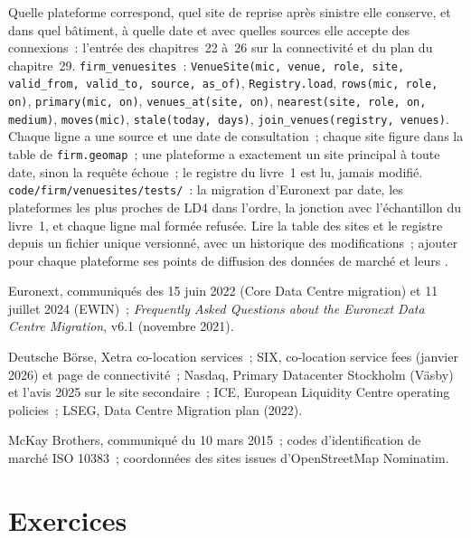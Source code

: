 \begin{build}
 Quelle plateforme correspond, quel site de reprise après sinistre elle conserve, et dans quel bâtiment, à quelle date et avec quelles sources elle accepte des connexions~:
l'entrée des chapitres~22 à~26 sur la connectivité et du plan du chapitre~29.
 \texttt{firm\_venuesites}~: \texttt{VenueSite(mic, venue, role, site, valid\_from, valid\_to, source, as\_of)},
\texttt{Registry.load}, \texttt{rows(mic, role, on)}, \texttt{primary(mic, on)}, \texttt{venues\_at(site, on)},
\texttt{nearest(site, role, on, medium)}, \texttt{moves(mic)}, \texttt{stale(today, days)}, \texttt{join\_venues(registry, venues)}.
 Chaque ligne a une source et une date de consultation~; chaque site figure dans la table de \texttt{firm.geomap}~; une plateforme a exactement un site principal à
toute date, sinon la requête échoue~; le registre du livre~1 est lu, jamais modifié.
 \texttt{code/firm/venuesites/tests/}~: la migration d'Euronext par date, les plateformes les plus proches de LD4 dans l'ordre, la
jonction avec l'échantillon du livre~1, et chaque ligne mal formée refusée.
 Lire la table des sites et le registre depuis un fichier unique versionné, avec un historique des modifications~; ajouter pour chaque plateforme ses points de diffusion des données de marché
et leurs .
\end{build}

\begin{omsources}
\item Euronext, communiqués des 15 juin 2022 (Core Data Centre migration) et 11 juillet 2024 (EWIN)~; \emph{Frequently Asked Questions about the
Euronext Data Centre Migration}, v6.1 (novembre 2021).
\item Deutsche Börse, Xetra co-location services~; SIX, co-location service fees (janvier 2026) et page de connectivité~; Nasdaq, Primary
Datacenter Stockholm (Väsby) et l'avis 2025 sur le site secondaire~; ICE, European Liquidity Centre operating policies~; LSEG, Data Centre Migration
plan (2022).
\item McKay Brothers, communiqué du 10 mars 2015~; codes d'identification de marché ISO 10383~; coordonnées des sites issues d'OpenStreetMap Nominatim.
\end{omsources}

\section{Exercices}


